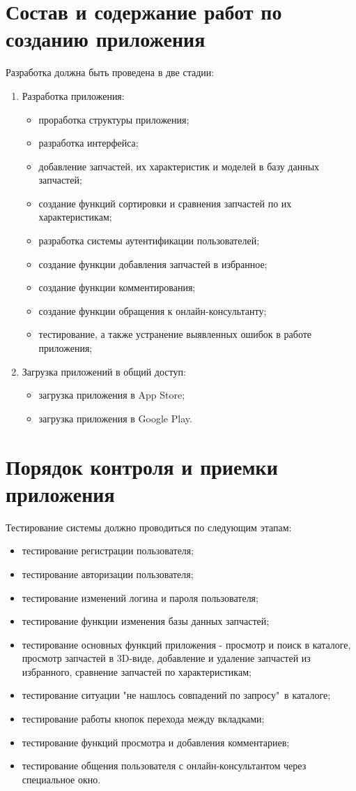 \documentclass[14pt]{extreport}
\begin{document}
\chapter{Состав и содержание работ по созданию приложения}
Разработка должна быть проведена в две стадии:
\begin{enumerate}
	\item Разработка приложения:
	\begin{itemize}
		\item проработка структуры приложения;
		\item разработка интерфейса;
		\item добавление запчастей, их характеристик и моделей в базу данных запчастей;
		\item создание функций сортировки и сравнения запчастей по их характеристикам;
		\item разработка системы аутентификации пользователей;
		\item создание функции добавления запчастей в избранное;
		\item создание функции комментирования;
		\item создание функции обращения к онлайн-консультанту;
		\item тестирование, а также устранение выявленных ошибок в работе приложения;
	\end{itemize}
	\item Загрузка приложений в общий доступ:
	\begin{itemize}
		\item загрузка приложения в App Store;
		\item загрузка приложения в Google Play.
	\end{itemize}
\end{enumerate} 


\chapter{Порядок контроля и приемки приложения}

Тестирование системы должно проводиться по следующим этапам:
\begin{itemize}
	\item тестирование регистрации пользователя;
	\item тестирование авторизации пользователя;
	\item тестирование изменений логина и пароля пользователя;
	\item тестирование функции изменения базы данных запчастей;
	\item тестирование основных функций приложения - просмотр и поиск в каталоге, просмотр запчастей в 3D-виде, добавление и удаление запчастей из избранного, сравнение запчастей по характеристикам;
	\item тестирование ситуации "не нашлось совпадений по запросу"\ в каталоге;
	\item тестирование работы кнопок перехода между вкладками;
	\item тестирование функций просмотра и добавления комментариев;
	\item тестирование общения пользователя с онлайн-консультантом через специальное окно.
\end{itemize}
\end{document}
